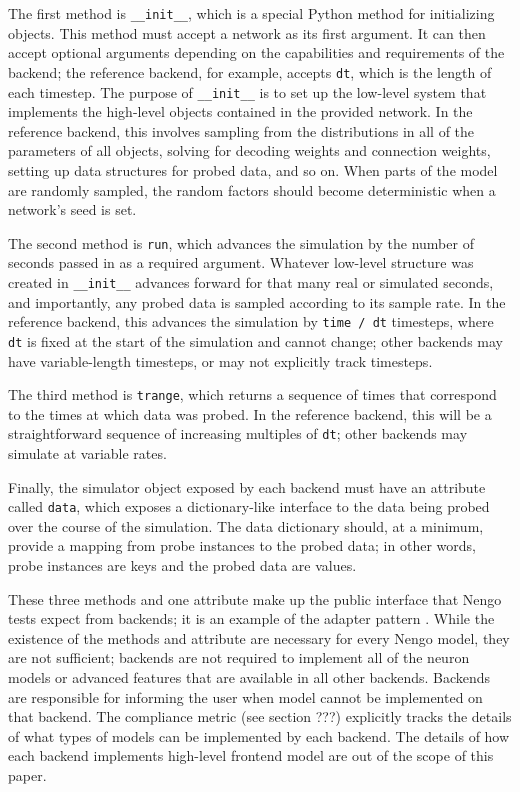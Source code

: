 \documentclass{frontiersSCNS}
\begin{document}
The first method is \texttt{\_\_init\_\_},
which is a special Python method for initializing objects.
This method must accept a network as its first argument.
It can then accept optional arguments depending on
the capabilities and requirements of the backend;
the reference backend, for example,
accepts \texttt{dt},
which is the length of each timestep.
The purpose of \texttt{\_\_init\_\_} is to
set up the low-level system
that implements the high-level objects
contained in the provided network.
In the reference backend,
this involves sampling from the distributions
in all of the parameters of all objects,
solving for decoding weights and connection weights,
setting up data structures for probed data,
and so on.
When parts of the model are randomly sampled,
the random factors should become deterministic
when a network's seed is set.

The second method is \texttt{run},
which advances the simulation
by the number of seconds
passed in as a required argument.
Whatever low-level structure was created
in \texttt{\_\_init\_\_} advances forward
for that many real or simulated seconds,
and importantly, any probed data is sampled
according to its sample rate.
In the reference backend,
this advances the simulation
by \texttt{time / dt} timesteps,
where \texttt{dt} is fixed at the start of the simulation
and cannot change;
other backends may have variable-length timesteps,
or may not explicitly track timesteps.

The third method is \texttt{trange},
which returns a sequence of times that correspond
to the times at which data was probed.
In the reference backend, this will be
a straightforward sequence of increasing
multiples of \texttt{dt};
other backends may simulate at variable rates.

Finally, the simulator object exposed by each backend
must have an attribute called \texttt{data},
which exposes a dictionary-like interface
to the data being probed over the course
of the simulation.
The data dictionary should,
at a minimum, provide a mapping from
probe instances to the probed data;
in other words, probe instances are keys
and the probed data are values.

These three methods and one attribute
make up the public interface
that Nengo tests expect from backends;
it is an example
of the adapter pattern \cite{???}. %
While the existence of the methods
and attribute are necessary
for every Nengo model,
they are not sufficient;
backends are not required
to implement all of the neuron models
or advanced features that
are available in all other backends.
Backends are responsible for informing
the user when model cannot be implemented
on that backend.
The compliance metric (see section ???)
explicitly tracks the details of what
types of models can be implemented
by each backend.
The details of how each backend
implements high-level frontend model
are out of the scope of this paper.
\end{document}
